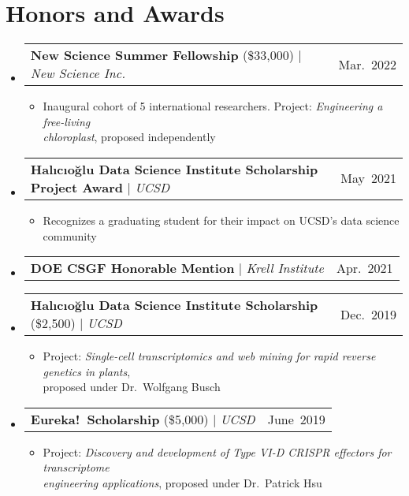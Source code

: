 \documentclass[letterpaper,11pt]{article}
\makeatletter
\newcommand{\resumeItem}[1]{
  \item
  \begin{minipage}[t]{0.7\textwidth}
    \small #1 
  \end{minipage}
}
\newcommand{\resumeEntry}[2]{
  \item
  \begin{tabular*}{0.97\textwidth}{l@{\extracolsep{\fill}}r}
    \small#1 & \small#2 \\
  \end{tabular*}
  \vspace{-7pt}
}
\newcommand{\resumeSubHeadingListStart}{
  \begin{itemize}[leftmargin=0.15in, label={}]
}
\newcommand{\resumeSubHeadingListEnd}{
  \end{itemize}
}
\newcommand{\resumeItemListStart}{
  \begin{itemize}[itemsep=.5pt]
}
\newcommand{\resumeItemListEnd}{
  \end{itemize}
  \vspace{-2pt}
}
\makeatother
\begin{document}
\section{Honors and Awards}
    \resumeSubHeadingListStart
      \resumeEntry
          {\textbf{New Science Summer Fellowship} (\$33,000) $|$ \emph{New Science Inc.}}{Mar.\ 2022}
          \resumeItemListStart
            \resumeItem{Inaugural cohort of 5 international researchers. Project: \emph{Engineering a free-living\\ chloroplast}, proposed independently}
          \resumeItemListEnd
      \resumeEntry
          {\textbf{Halıcıoğlu Data Science Institute Scholarship Project Award} $|$ \emph{UCSD}}{May\ 2021}
          \resumeItemListStart
            \resumeItem{Recognizes a graduating student for their impact on UCSD's data science community}
          \resumeItemListEnd
      \resumeEntry
          {\textbf{DOE CSGF Honorable Mention} $|$ \emph{Krell Institute}}{Apr.\ 2021}
      \resumeEntry
          {\textbf{Halıcıoğlu Data Science Institute Scholarship} (\$2,500) $|$ \emph{UCSD}}{Dec.\ 2019}
          \resumeItemListStart
            \resumeItem{Project: \emph{Single-cell transcriptomics and web mining for rapid reverse genetics in plants},\\ proposed under Dr.\ Wolfgang Busch}
          \resumeItemListEnd
       \resumeEntry
          {\textbf{Eureka!\ Scholarship} (\$5,000) $|$ \emph{UCSD}}{June\ 2019}
          \resumeItemListStart
            \resumeItem{Project: \emph{Discovery and development of Type VI-D CRISPR effectors for transcriptome\\ engineering applications}, proposed under Dr.\ Patrick Hsu}
          \resumeItemListEnd
    \resumeSubHeadingListEnd






\end{document}

